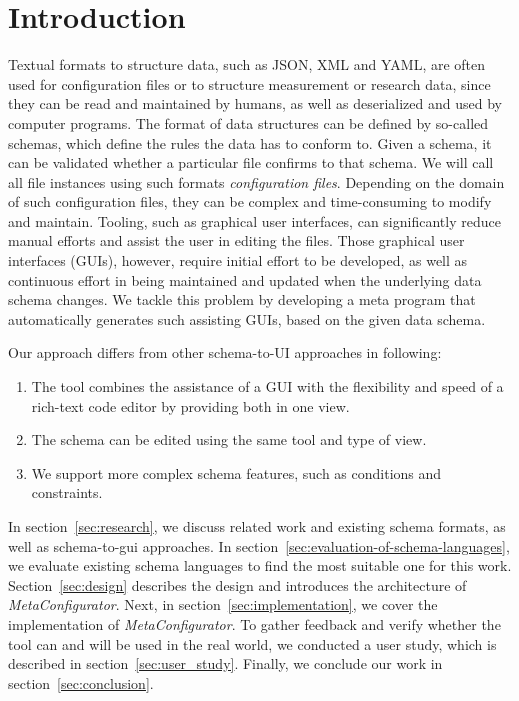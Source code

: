 \documentclass[lettersize,journal]{IEEEtran}
\newcommand{\cfgfiles}{configuration files}
\newcommand{\toolname}{\textit{MetaConfigurator}} %
\begin{document}
 \section{Introduction}\label{sec:introduction} %

 Textual formats to structure data, such as JSON, XML and YAML, are often used for configuration files or to structure measurement or research data, since they can be read and maintained by humans, as well as deserialized and used by computer programs.
 The format of data structures can be defined by so-called schemas, which define the rules the data has to conform to.
 Given a schema, it can be validated whether a particular file confirms to that schema.
 We will call all file instances using such formats \textit{\cfgfiles}.
 Depending on the domain of such \cfgfiles, they can be complex and time-consuming to modify and maintain.
 Tooling, such as graphical user interfaces, can significantly reduce manual efforts and assist the user in editing the files.
 Those graphical user interfaces (GUIs), however, require initial effort to be developed, as well as continuous effort in being maintained and updated when the underlying data schema changes.
 We tackle this problem by developing a meta program that automatically generates such assisting GUIs, based on the given data schema.

 Our approach differs from other schema-to-UI approaches in following:

 \begin{enumerate}
  \item The tool combines the assistance of a GUI with the flexibility and speed of a rich-text code editor by providing both in one view.
  \item The schema can be edited using the same tool and type of view.
  \item We support more complex schema features, such as conditions and constraints.
 \end{enumerate}


 In section~\ref{sec:research}, we discuss related work and existing schema formats, as well as schema-to-gui approaches.
 In section~\ref{sec:evaluation-of-schema-languages}, we evaluate existing schema languages to find the most suitable one for this work.
 Section~\ref{sec:design} describes the design and introduces the architecture of \toolname{}.
 Next, in section~\ref{sec:implementation}, we cover the implementation of \toolname{}.
 To gather feedback and verify whether the tool can and will be used in the real world, we conducted a user study, which is described in section~\ref{sec:user_study}.
 Finally, we conclude our work in section~\ref{sec:conclusion}.
\end{document}
